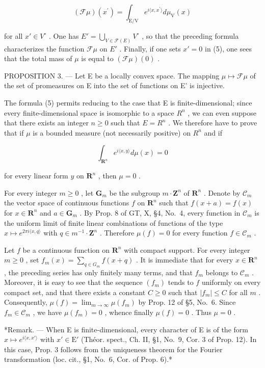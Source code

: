 \[
(\mathcal {F} \mu) (x ^ {\prime}) = \int_ {\mathrm{E} / \mathrm{V}} e ^ {i \langle x, x ^ {\prime} \rangle} d \mu_ {\mathrm{V}} (x)\tag{5}
\]

for all \(x' \in V^{\circ}\) . One has \(E' = \bigcup_{V \in \mathcal{F}(E)} V^{\circ}\) , so that the preceding formula characterizes the function \(\mathcal{F}\mu\) on \(E'\) . Finally, if one sets \(x' = 0\) in (5), one sees that the total mass of \(\mu\) is equal to \((\mathcal{F}\mu)(0)\) .

PROPOSITION 3. --- Let E be a locally convex space. The mapping \(\mu \mapsto \mathcal{F}\mu\) of the set of promeasures on E into the set of functions on E' is injective.

The formula (5) permits reducing to the case that E is finite-dimensional; since every finite-dimensional space is isomorphic to a space \(R^{n}\) , we can even suppose that there exists an integer \(n \geqslant 0\) such that \(E = R^{n}\) . We therefore have to prove that if \(\mu\) is a bounded measure (not necessarily positive) on \(R^{n}\) and if

\[
\int_ {\mathbf {R} ^ {n}} e ^ {i \langle x, y \rangle} d \mu (x) = 0
\]

for every linear form \(y\) on \(\mathbf{R}^n\) , then \(\mu = 0\) .

For every integer \(m \geqslant 0\) , let \(\mathbf{G}_m\) be the subgroup \(m \cdot \mathbf{Z}^n\) of \(\mathbf{R}^n\) . Denote by \(\mathcal{C}_m\) the vector space of continuous functions \(f\) on \(\mathbf{R}^n\) such that \(f(x + a) = f(x)\) for \(x \in \mathbf{R}^n\) and \(a \in \mathbf{G}_m\) . By Prop. 8 of GT, X, §4, No.~4, every function in \(\mathcal{C}_m\) is the uniform limit of finite linear combinations of functions of the type \(x \mapsto e^{2\pi i\langle x,q\rangle}\) with \(q \in m^{-1} \cdot \mathbf{Z}^n\) . Therefore \(\mu(f) = 0\) for every function \(f \in \mathcal{C}_m\) .

Let \(f\) be a continuous function on \(\mathbf{R}^n\) with compact support. For every integer \(m \geqslant 0\) , set \(f_m(x) = \sum_{q \in G_m} f(x + q)\) . It is immediate that for every \(x \in \mathbf{R}^n\) , the preceding series has only finitely many terms, and that \(f_m\) belongs to \(\mathcal{C}_m\) . Moreover, it is easy to see that the sequence \((f_m)\) tends to \(f\) uniformly on every compact set, and that there exists a constant \(C \geqslant 0\) such that \(|f_m| \leqslant C\) for all \(m\) . Consequently, \(\mu(f) = \lim_{m \to \infty} \mu(f_m)\) by Prop. 12 of §5, No.~6. Since \(f_m \in \mathcal{C}_m\) , we have \(\mu(f_m) = 0\) , whence finally \(\mu(f) = 0\) . Thus \(\mu = 0\) .

*Remark. --- When E is finite-dimensional, every character of E is of the form \(x \mapsto e^{i\langle x,x' \rangle}\) with \(x' \in \mathrm{E}'\) (Théor. spect., Ch. II, §1, No.~9, Cor. 3 of Prop. 12). In this case, Prop. 3 follows from the uniqueness theorem for the Fourier transformation (loc. cit., §1, No.~6, Cor. of Prop. 6).*

